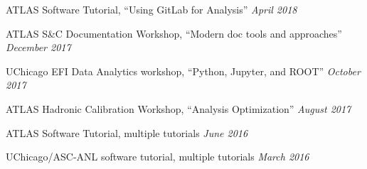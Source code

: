 \documentclass[margin,line]{resume}
\begin{document}
\begin{resume}
\begin{list2}
  \item ATLAS Software Tutorial, ``Using GitLab for Analysis'' \hfill \textsl{April 2018}
  \item ATLAS S\&C Documentation Workshop, ``Modern doc tools and approaches'' \hfill \textsl{December 2017}
  \item UChicago EFI Data Analytics workshop, ``Python, Jupyter, and ROOT'' \hfill \textsl{October 2017}
  \item ATLAS Hadronic Calibration Workshop, ``Analysis Optimization'' \hfill \textsl{August 2017}
  \item ATLAS Software Tutorial, multiple tutorials \hfill \textsl{June 2016}
  \item UChicago/ASC-ANL software tutorial, multiple tutorials \hfill \textsl{March 2016}
\end{list2}


\end{resume}
\end{document}
